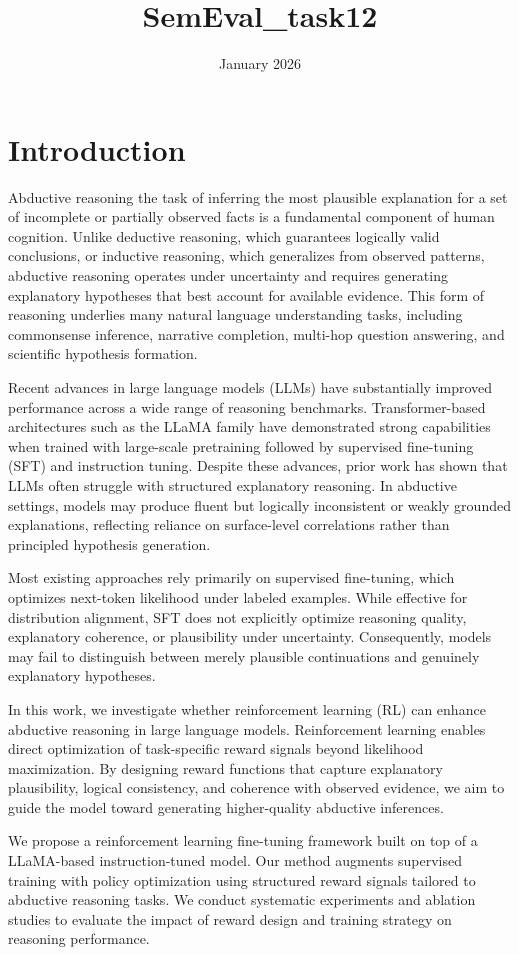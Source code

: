\documentclass{article}
\title{SemEval_task12}
\author{}
\date{January 2026}
\begin{document}
\section{Introduction}
Abductive reasoning the task of inferring the most plausible explanation for a set of incomplete or partially observed facts is a fundamental component of human cognition. Unlike deductive reasoning, which guarantees logically valid conclusions, or inductive reasoning, which generalizes from observed patterns, abductive reasoning operates under uncertainty and requires generating explanatory hypotheses that best account for available evidence. This form of reasoning underlies many natural language understanding tasks, including commonsense inference, narrative completion, multi-hop question answering, and scientific hypothesis formation.

Recent advances in large language models (LLMs) have substantially improved performance across a wide range of reasoning benchmarks. Transformer-based architectures such as the LLaMA family have demonstrated strong capabilities when trained with large-scale pretraining followed by supervised fine-tuning (SFT) and instruction tuning. Despite these advances, prior work has shown that LLMs often struggle with structured explanatory reasoning. In abductive settings, models may produce fluent but logically inconsistent or weakly grounded explanations, reflecting reliance on surface-level correlations rather than principled hypothesis generation.

Most existing approaches rely primarily on supervised fine-tuning, which optimizes next-token likelihood under labeled examples. While effective for distribution alignment, SFT does not explicitly optimize reasoning quality, explanatory coherence, or plausibility under uncertainty. Consequently, models may fail to distinguish between merely plausible continuations and genuinely explanatory hypotheses.

In this work, we investigate whether reinforcement learning (RL) can enhance abductive reasoning in large language models. Reinforcement learning enables direct optimization of task-specific reward signals beyond likelihood maximization. By designing reward functions that capture explanatory plausibility, logical consistency, and coherence with observed evidence, we aim to guide the model toward generating higher-quality abductive inferences.

We propose a reinforcement learning fine-tuning framework built on top of a LLaMA-based instruction-tuned model. Our method augments supervised training with policy optimization using structured reward signals tailored to abductive reasoning tasks. We conduct systematic experiments and ablation studies to evaluate the impact of reward design and training strategy on reasoning performance.
\end{document}
